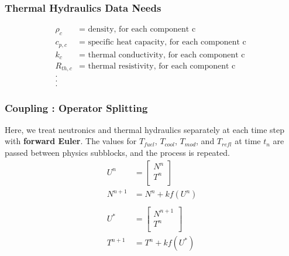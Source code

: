 \begin{frame}[fragile]
  \frametitle{Thermal Hydraulics Data Needs}
\footnotesize{
  \begin{align} 
    \rho_{c} &= \mbox{ density, for each component c }\\
    c_{p,c} &= \mbox{ specific heat capacity, for each component c }\\
    k_{c} &= \mbox{ thermal conductivity, for each component c }\\
    R_{th,c} &= \mbox{ thermal resistivity, for each component c }\\
    . &\\\nonumber
    . &\\\nonumber
    . &\nonumber
  \end{align}
}
\end{frame}



\begin{frame}[fragile]
  \frametitle{Coupling : Operator Splitting}
  Here, we treat neutronics and thermal hydraulics separately at 
  each time step with \textbf{forward Euler}. The values for $T_{fuel}$, 
  $T_{cool}$, $T_{mod}$, and $T_{refl}$ at time $t_n$ 
  are passed between physics subblocks, and the process is repeated.
  \footnotesize{
  \begin{align} 
    U^n &= \left[
                  \begin{array}{ c }
                    N^n\\
                    T^n\\
                  \end{array}
                  \right]\\
    N^{n+1} &= N^n + kf(U^n)\\
    \nonumber\\
    U^* &= \left[
                  \begin{array}{ c }
                    N^{n+1}\\
                    T^n\\
                  \end{array}
                  \right]\\
    T^{n+1} &= T^n + kf(U^*)
  \end{align}
  }
\end{frame}


